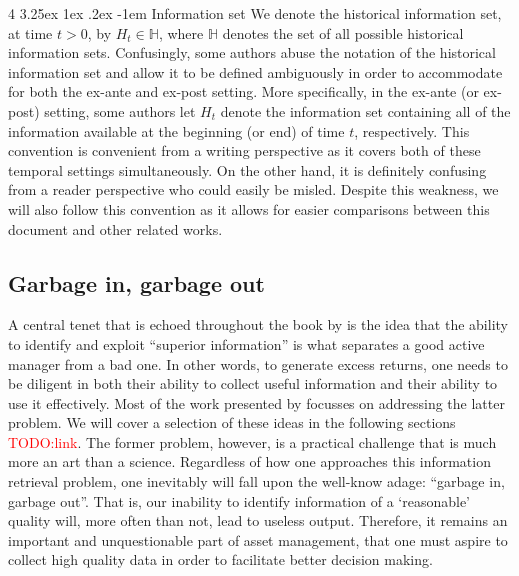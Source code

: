 \documentclass[12pt]{article}
\makeatletter
\renewcommand\paragraph{%
	\@startsection{paragraph}
	{4}
	{\z@}
	{3.25ex \@plus1ex \@minus.2ex}
	{-1em}
	{\normalfont\normalsize\bfseries\maybe@addperiod}%
}
\newcommand{\maybe@addperiod}[1]{%
	#1\@addpunct{.}%
}
\makeatother
\begin{document}
\paragraph{Information set} We denote the historical information set, at time $t > 0$, by $H_t \in \mathbb{H}$, where $\mathbb{H}$ denotes the set of all possible historical information sets. Confusingly, some authors abuse the notation of the historical information set and allow it to be defined ambiguously in order to accommodate for both the ex-ante and ex-post setting. More specifically, in the ex-ante (or ex-post) setting, some authors let $H_t$ denote the information set containing all of the information available at the beginning (or end) of time $t$, respectively. This convention is convenient from a writing perspective as it covers both of these temporal settings simultaneously. On the other hand, it is definitely confusing from a reader perspective who could easily be misled. Despite this weakness, we will also follow this convention as it allows for easier comparisons between this document and other related works.

\subsection{Garbage in, garbage out}
A central tenet that is echoed throughout the book by \cite{grinold1999} is the idea that the ability to identify and exploit ``superior information'' is what separates a good active manager from a bad one. In other words, to generate excess returns, one needs to be diligent in both their ability to collect useful information and their ability to use it effectively. Most of the work presented by \cite{grinold1999} focusses on addressing the latter problem. We will cover a selection of these ideas in the following sections \textcolor{red}{TODO:link}. The former problem, however, is a practical challenge that is much more an art than a science. Regardless of how one approaches this information retrieval problem, one inevitably will fall upon the well-know adage: ``garbage in, garbage out''. That is, our inability to identify information of a `reasonable' quality will, more often than not, lead to useless output. Therefore, it remains an important and unquestionable part of asset management, that one must aspire to collect high quality data in order to facilitate better decision making.

\end{document}
